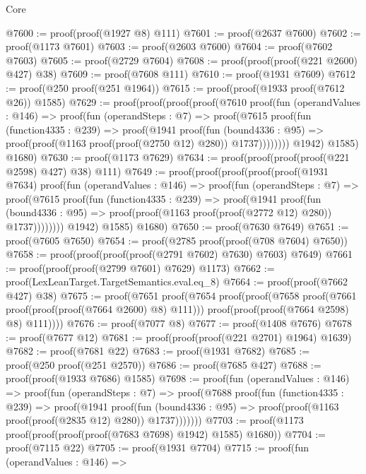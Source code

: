 \begin{lexlean}{Core}
\begin{coremodule}
@7600 := proof(proof(@1927 @8) @111)
@7601 := proof(@2637 @7600)
@7602 := proof(@1173 @7601)
@7603 := proof(@2603 @7600)
@7604 := proof(@7602 @7603)
@7605 := proof(@2729 @7604)
@7608 := proof(proof(proof(@221 @2600) @427) @38)
@7609 := proof(@7608 @111)
@7610 := proof(@1931 @7609)
@7612 := proof(@250 proof(@251 @1964))
@7615 := proof(proof(@1933 proof(@7612 @26)) @1585)
@7629 := proof(proof(proof(proof(@7610
            proof(fun (operandValues : @146) =>
              proof(fun (operandSteps : @7) =>
                proof(@7615
                    proof(fun (function4335 : @239) =>
                      proof(@1941
                          proof(fun (bound4336 : @95) =>
                            proof(proof(@1163 proof(proof(@2750 @12) @280)) @1737))))))))
          @1942)
        @1585)
      @1680)
@7630 := proof(@1173 @7629)
@7634 := proof(proof(proof(proof(@221 @2598) @427) @38) @111)
@7649 := proof(proof(proof(proof(proof(@1931 @7634)
            proof(fun (operandValues : @146) =>
              proof(fun (operandSteps : @7) =>
                proof(@7615
                    proof(fun (function4335 : @239) =>
                      proof(@1941
                          proof(fun (bound4336 : @95) =>
                            proof(proof(@1163 proof(proof(@2772 @12) @280)) @1737))))))))
          @1942)
        @1585)
      @1680)
@7650 := proof(@7630 @7649)
@7651 := proof(@7605 @7650)
@7654 := proof(@2785 proof(proof(@708 @7604) @7650))
@7658 := proof(proof(proof(proof(@2791 @7602) @7630) @7603) @7649)
@7661 := proof(proof(proof(@2799 @7601) @7629) @1173)
@7662 := proof(LexLeanTarget.TargetSemantics.eval.eq_8)
@7664 := proof(proof(@7662 @427) @38)
@7675 := proof(@7651
      proof(@7654
          proof(proof(@7658 proof(@7661 proof(proof(proof(@7664 @2600) @8) @111)))
              proof(proof(proof(@7664 @2598) @8) @111))))
@7676 := proof(@7077 @8)
@7677 := proof(@1408 @7676)
@7678 := proof(@7677 @12)
@7681 := proof(proof(proof(@221 @2701) @1964) @1639)
@7682 := proof(@7681 @22)
@7683 := proof(@1931 @7682)
@7685 := proof(@250 proof(@251 @2570))
@7686 := proof(@7685 @427)
@7688 := proof(proof(@1933 @7686) @1585)
@7698 := proof(fun (operandValues : @146) =>
    proof(fun (operandSteps : @7) =>
      proof(@7688
          proof(fun (function4335 : @239) =>
            proof(@1941
                proof(fun (bound4336 : @95) =>
                  proof(proof(@1163 proof(proof(@2835 @12) @280)) @1737)))))))
@7703 := proof(@1173 proof(proof(proof(proof(@7683 @7698) @1942) @1585) @1680))
@7704 := proof(@7115 @22)
@7705 := proof(@1931 @7704)
@7715 := proof(fun (operandValues : @146) =>

\end{coremodule}
\end{lexlean}
